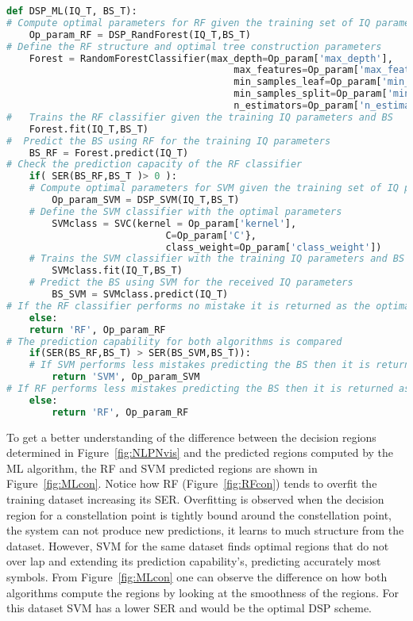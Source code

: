 \begin{lstlisting}[language=Python,caption=Machine learning enabled DSP scheme that  returns the best performing ML algorithm and its optimal parameter for the training dataset. ,label=lis:MLDSP]
def DSP_ML(IQ_T, BS_T):
# Compute optimal parameters for RF given the training set of IQ parameters
	Op_param_RF = DSP_RandForest(IQ_T,BS_T)
# Define the RF structure and optimal tree construction parameters
	Forest = RandomForestClassifier(max_depth=Op_param['max_depth'],
										max_features=Op_param['max_features'],
										min_samples_leaf=Op_param['min_samples_leaf'],
										min_samples_split=Op_param['min_samples_split'],
										n_estimators=Op_param['n_estimators'])
#	Trains the RF classifier given the training IQ parameters and BS
	Forest.fit(IQ_T,BS_T)
#  Predict the BS using RF for the training IQ parameters
	BS_RF = Forest.predict(IQ_T)
# Check the prediction capacity of the RF classifier 
	if( SER(BS_RF,BS_T )> 0 ):
	# Compute optimal parameters for SVM given the training set of IQ parameters and BS
		Op_param_SVM = DSP_SVM(IQ_T,BS_T)
	# Define the SVM classifier with the optimal parameters 
		SVMclass = SVC(kernel = Op_param['kernel'],
							C=Op_param['C'},
							class_weight=Op_param['class_weight'])
	# Trains the SVM classifier with the training IQ parameters and BS      
		SVMclass.fit(IQ_T,BS_T)
	# Predict the BS using SVM for the received IQ parameters
		BS_SVM = SVMclass.predict(IQ_T)
# If the RF classifier performs no mistake it is returned as the optimal classifier
	else:
   	return 'RF', Op_param_RF
# The prediction capability for both algorithms is compared 
	if(SER(BS_RF,BS_T) > SER(BS_SVM,BS_T)):
	# If SVM performs less mistakes predicting the BS then it is returned as the optimal classifier
		return 'SVM', Op_param_SVM
# If RF performs less mistakes predicting the BS then it is returned as the optimal classifier
	else:
		return 'RF', Op_param_RF
\end{lstlisting}	

To get a better understanding of the difference between the decision regions determined in Figure~\ref{fig:NLPNvis} and the predicted regions computed by the ML algorithm, the RF and SVM predicted regions are shown in Figure~\ref{fig:MLcon}. Notice how RF (Figure~\ref{fig:RFcon}) tends to overfit the training dataset increasing its SER. Overfitting is observed when the decision region for a constellation point is tightly bound around the constellation point, the system can not produce new predictions, it learns to much structure from the dataset. However, SVM for the same dataset finds optimal regions that do not over lap and extending its prediction capability's, predicting accurately most symbols. From Figure~\ref{fig:MLcon} one can observe the difference on how both algorithms compute the regions by looking at the smoothness of the regions. For this dataset SVM has a lower SER and would  be the optimal DSP scheme.

